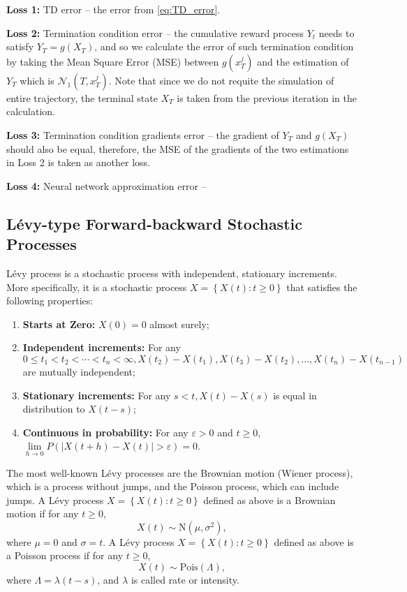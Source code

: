 \documentclass[12pt,letterpaper,oneside]{article}
\begin{document}
	\textbf{Loss 1: } TD error -- the error from \autoref{eq:TD_error}.
	
	\textbf{Loss 2: } Termination condition error -- the cumulative reward process $ Y_t $ needs to satisfy $ Y_T = g(X_T) $, and so we calculate the error of such termination condition by taking the Mean Square Error (MSE) between $ g(x_T^j) $ and the estimation of $ Y_T $ which is $ \mathcal{N}_1(T,x_T^j) $. Note that since we do not requite the simulation of entire trajectory, the terminal state $ X_T $ is taken from the previous iteration in the calculation. 
	
	\textbf{Loss 3: } Termination condition gradients error -- the gradient of $ Y_T $ and $ g(X_T) $ should also be equal, therefore, the MSE of the gradients of the two estimations in Loss 2 is taken as another loss.
	
	\textbf{Loss 4: } Neural network approximation error -- 
	
	
\subsection{L\'evy-type Forward-backward Stochastic Processes}
	L\'evy process is a stochastic process with independent, stationary increments. More specifically, it is a stochastic process $X=\left\{X(t): t \geq 0\right\}$ that satisfies the following properties:
	\begin{enumerate}
		\item \textbf{Starts at Zero: }$X(0)=0$ almost surely;
		\item \textbf{Independent increments: }For any $0 \leq t_1<t_2<\cdots<t_n<\infty, X(t_2)-X(t_1), X(t_3)-X(t_2), \ldots, X(t_n)-X(t_{n-1})$ are mutually independent;
		\item \textbf{Stationary increments: }For any $s<t, X(t)-X(s)$ is equal in distribution to $X(t-s)$;
		\item \textbf{Continuous in probability: }For any $\varepsilon>0$ and $t \geq 0$, $\lim \limits_{h \rightarrow 0} P\left(\left|X(t+h)-X(t)\right|>\varepsilon\right)=0$.
	\end{enumerate}
	 The most well-known L\'evy processes are the Brownian motion (Wiener process), which is a process without jumps, and the Poisson process, which can include jumps. A L\'evy process $X=\left\{X(t): t \geq 0\right\}$ defined as above is a Brownian motion if for any $t\ge 0$,
	 $$ X(t) \sim \text{N}(\mu, \sigma^2), $$
	 where $ \mu = 0 $ and $ \sigma = t $.
	 A L\'evy process $X=\left\{X(t): t \geq 0\right\}$ defined as above is a Poisson process if for any $t\ge 0$,
	 $$ X(t) \sim \text{Pois}(\Lambda), $$ 
	 where $ \Lambda = \lambda(t-s) $, and $ \lambda $ is called rate or intensity.
	 
\end{document}
